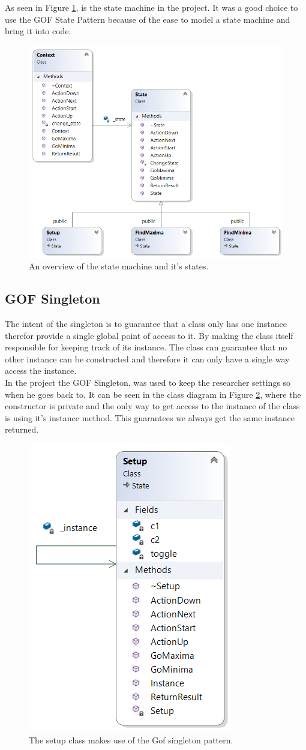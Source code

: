 As seen in Figure \ref{fig:statemachine}, is the state machine in the project. It was a good choice to use the GOF State Pattern because of the ease to model a state machine and bring it into code. 

\begin{figure}[h]
	\centering
	\includegraphics[width=0.7\linewidth]{diagram/StateMachine}
	\caption{An overview of the state machine and it's states.}
	\label{fig:statemachine}
\end{figure}

\subsection{GOF Singleton}
The intent of the singleton is to guarantee that a class only has one instance therefor provide a single global point of access to it. By making the class itself responsible for keeping track of its instance. The class can guarantee that no other instance can be constructed and therefore it can only have a single way access the instance.
\\
In the project the GOF Singleton, was used to keep the researcher settings so when he goes back to. It can be seen in the class diagram in Figure \ref{fig:singleton}, where the constructor is private and the only way to get access to the instance of the class is using it's instance method. This guarantees we always get the same instance returned.

\begin{figure}[h]
	\centering
	\includegraphics[width=0.4\linewidth]{diagram/singleton}
	\caption[Gof Singleton]{The setup class makes use of the Gof singleton pattern. }
	\label{fig:singleton}
\end{figure}

